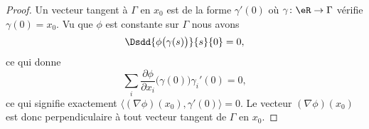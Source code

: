\begin{proof}
    Un vecteur tangent à \( \Gamma\) en \( x_0\) est de la forme \( \gamma'(0)\) où \( \gamma\colon \eR \to \Gamma\) vérifie \( \gamma(0)=x_0\). Vu que \( \phi\) est constante sur \( \Gamma\) nous avons
    \begin{equation}
        \Dsdd{ \phi\big( \gamma(s) \big) }{s}{0}=0,
    \end{equation}
    ce qui donne
    \begin{equation}
        \sum_i\frac{ \partial \phi }{ \partial x_i }\big( \gamma(0) \big)\gamma_i'(0)=0,
    \end{equation}
    ce qui signifie exactement \( \langle (\nabla\phi)(x_0), \gamma'(0)\rangle=0\). Le vecteur \( (\nabla\phi)(x_0)\) est donc perpendiculaire à tout vecteur tangent de \( \Gamma\) en \( x_0\).
\end{proof}
